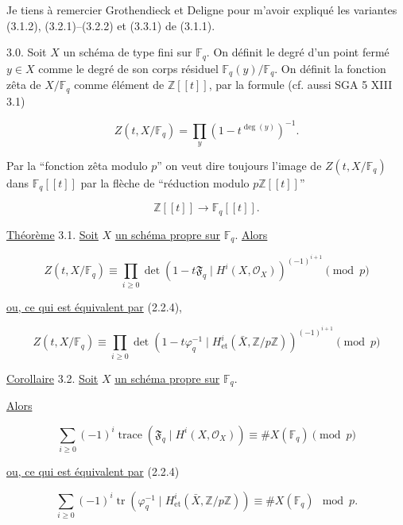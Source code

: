 Je tiens à remercier Grothendieck et Deligne pour m'avoir expliqué les
variantes (3.1.2), (3.2.1)--(3.2.2) et (3.3.1) de (3.1.1).

3.0. Soit $X$ un schéma de type fini sur $\mathbb F_q$. On définit le degré
d'un point fermé $y\in X$ comme le degré de son corps résiduel
$\mathbb F_q(y)/\mathbb F_q$. On définit la fonction zêta de
$X/\mathbb F_q$ comme élément de $\mathbb Z[[t]]$, par la formule
(cf. aussi SGA 5 XIII 3.1)

\begin{equation}\tag{3.0.1}
Z(t,X/\mathbb F_q)=\prod_y(1-t^{\deg(y)})^{-1}.
\end{equation}

Par la ``fonction zêta modulo $p$'' on veut dire toujours l'image de
$Z(t,X/\mathbb F_q)$ dans $\mathbb F_q[[t]]$ par la flèche de ``réduction
modulo $p\mathbb Z[[t]]$''

\[
\mathbb Z[[t]]\longrightarrow\mathbb F_q[[t]].
\]

\underline{Théorème} 3.1. \underline{Soit} $X$ \underline{un schéma propre sur}
$\mathbb F_q$. \underline{Alors}

\begin{equation}\tag{3.1.1}
Z(t,X/\mathbb F_q)
\equiv
\prod_{i\geq0}
\det\!\left(1-t\mathfrak F_q\mid H^i(X,\mathcal O_X)\right)^{(-1)^{i+1}}
\pmod p
\end{equation}

\underline{ou, ce qui est équivalent par} (2.2.4),

\begin{equation}\tag{3.1.2}
Z(t,X/\mathbb F_q)
\equiv
\prod_{i\geq0}
\det\!\left(1-t\varphi_q^{-1}\mid
H^i_{\mathrm{et}}(\bar X,\mathbb Z/p\mathbb Z)\right)^{(-1)^{i+1}}
\pmod p
\end{equation}

\underline{Corollaire} 3.2. \underline{Soit} $X$ \underline{un schéma propre sur}
$\mathbb F_q$.

\underline{Alors}

\begin{equation}\tag{3.2.1}
\sum_{i\geq0}(-1)^i
\operatorname{trace}\!\left(\mathfrak F_q\mid H^i(X,\mathcal O_X)\right)
\equiv \#X(\mathbb F_q)\pmod p
\end{equation}

\underline{ou, ce qui est équivalent par} (2.2.4)


\begin{equation}\tag{3.2.2}
\sum_{i\geq0}(-1)^i
\operatorname{tr}\!\left(\varphi_q^{-1}\mid
H^i_{\mathrm{et}}(\bar X,\mathbb Z/p\mathbb Z)\right)
\equiv \#X(\mathbb F_q)\mod p.
\end{equation}

